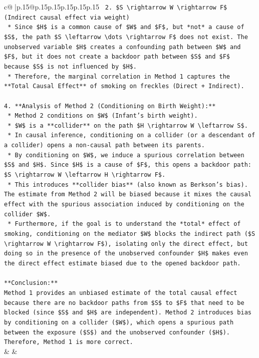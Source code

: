 \documentclass{article}
\begin{document}
{\begin{supertabular}{c@{$\;$}|p{.15\linewidth}@{}p{.15\linewidth}p{.15\linewidth}p{.15\linewidth}p{.15\linewidth}p{.15\linewidth}}
{{{\texttt{        2.  \$S \textbackslash{}rightarrow W \textbackslash{}rightarrow F\$ (Indirect causal effect via weight)} \\
\texttt{    *   Since \$H\$ is a common cause of \$W\$ and \$F\$, but *not* a cause of \$S\$, the path \$S \textbackslash{}leftarrow \textbackslash{}dots \textbackslash{}rightarrow F\$ does not exist. The unobserved variable \$H\$ creates a confounding path between \$W\$ and \$F\$, but it does not create a backdoor path between \$S\$ and \$F\$ because \$S\$ is not influenced by \$H\$.} \\
\texttt{    *   Therefore, the marginal correlation in Method 1 captures the **Total Causal Effect** of smoking on freckles (Direct + Indirect).} \\
\\ 
\texttt{4.  **Analysis of Method 2 (Conditioning on Birth Weight):**} \\
\texttt{    *   Method 2 conditions on \$W\$ (Infant's birth weight).} \\
\texttt{    *   \$W\$ is a **collider** on the path \$H \textbackslash{}rightarrow W \textbackslash{}leftarrow S\$.} \\
\texttt{    *   In causal inference, conditioning on a collider (or a descendant of a collider) opens a non{-}causal path between its parents.} \\
\texttt{    *   By conditioning on \$W\$, we induce a spurious correlation between \$S\$ and \$H\$. Since \$H\$ is a cause of \$F\$, this opens a backdoor path: \$S \textbackslash{}rightarrow W \textbackslash{}leftarrow H \textbackslash{}rightarrow F\$.} \\
\texttt{    *   This introduces **collider bias** (also known as Berkson's bias). The estimate from Method 2 will be biased because it mixes the causal effect with the spurious association induced by conditioning on the collider \$W\$.} \\
\texttt{    *   Furthermore, if the goal is to understand the *total* effect of smoking, conditioning on the mediator \$W\$ blocks the indirect path (\$S \textbackslash{}rightarrow W \textbackslash{}rightarrow F\$), isolating only the direct effect, but doing so in the presence of the unobserved confounder \$H\$ makes even the direct effect estimate biased due to the opened backdoor path.} \\
\\ 
\texttt{**Conclusion:**} \\
\texttt{Method 1 provides an unbiased estimate of the total causal effect because there are no backdoor paths from \$S\$ to \$F\$ that need to be blocked (since \$S\$ and \$H\$ are independent). Method 2 introduces bias by conditioning on a collider (\$W\$), which opens a spurious path between the exposure (\$S\$) and the unobserved confounder (\$H\$). Therefore, Method 1 is more correct.} \\
            }
        }
    }
    & & \\ \\


\end{supertabular}}
\end{document}
